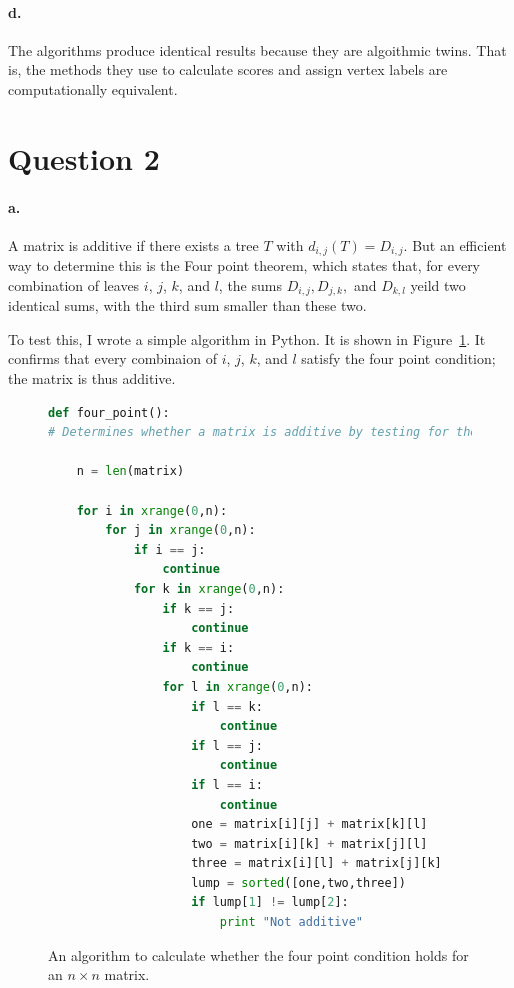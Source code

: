 \documentclass[12pt]{article}
\begin{document}
\paragraph{d.} 

The algorithms produce identical results because they are algoithmic twins.  That is, the methods they use to calculate scores and assign vertex labels are computationally equivalent.

\clearpage
\section*{Question 2}
\paragraph{a.} 
A matrix is additive if there exists a tree $T$ with $d_{i,j}(T) = D_{i,j}$.  But an efficient way to determine this is the Four point theorem, which states that, for every combination of leaves $i$, $j$, $k$, and $l$, the sums $D_{i,j}, D_{j,k},$ and $ D_{k,l}$ yeild two identical sums, with the third sum smaller than these two.

To test this, I wrote a simple algorithm in Python.  It is shown in Figure~\ref{fourpoint}.  It confirms that every combinaion of  $i$, $j$, $k$, and $l$ satisfy the four point condition; the matrix is thus additive.

\begin{figure}[htb]
\centering
\begin{lstlisting}[language=Python]
def four_point():
# Determines whether a matrix is additive by testing for the four point condidtion.  Expects matrix as a list of lists

	n = len(matrix)

	for i in xrange(0,n):
		for j in xrange(0,n):
			if i == j:
				continue
			for k in xrange(0,n):
				if k == j:
					continue
				if k == i:
					continue
				for l in xrange(0,n):
					if l == k:
						continue
					if l == j:
						continue
					if l == i:
						continue
					one = matrix[i][j] + matrix[k][l]
					two = matrix[i][k] + matrix[j][l]
					three = matrix[i][l] + matrix[j][k]
					lump = sorted([one,two,three])
					if lump[1] != lump[2]:
						print "Not additive"
	\end{lstlisting}

	\caption{An algorithm to calculate whether the four point condition holds for an $n\times n$ matrix.}
	\label{fourpoint}


\end{figure}
\end{document}
